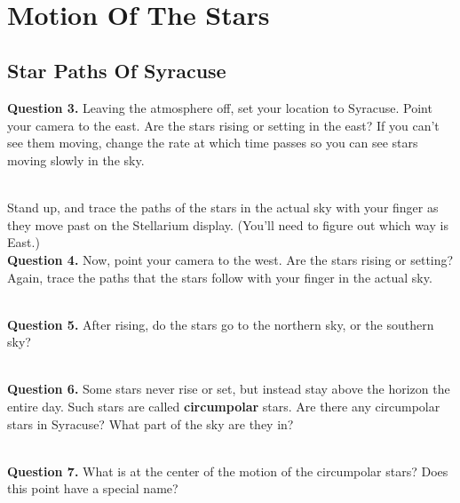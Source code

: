 \documentclass[11pt]{article}
\begin{document}
\hrulefill\\

\newpage

\section{Motion Of The Stars}

\subsection{Star Paths Of Syracuse}

\textbf{Question 3.} Leaving the atmosphere off, set your location to Syracuse. Point your camera to the east. Are the stars rising or setting in the east? If you can't see them moving, change the rate at which time passes so you can see stars moving slowly in
the sky.

\vspace*{1.5cm}

\hrulefill\\
Stand up, and trace the paths of the stars in the actual sky with your finger as they move past on the Stellarium display. (You'll need to figure out which way is East.) \\


\textbf{Question 4.} Now, point your camera to the west. Are the stars rising or setting? Again, trace the paths that the stars follow
with your finger in the actual sky.\\
\vspace*{1.5cm}

\hrulefill\\   

\textbf{Question 5.} After rising, do the stars go to the northern sky, or the southern sky?\\
\vspace*{1.5cm}

\hrulefill\\

\textbf{Question 6.} Some stars never rise or set, but instead stay above the horizon the entire day. Such stars are called \textbf{circumpolar} stars. Are there any circumpolar stars in Syracuse? What part of the sky are they in?\\
\vspace*{1.5cm}

\hrulefill\\
\newpage
\textbf{Question 7.} What is at the center of the motion of the circumpolar stars? Does this point have a special name?\\
\vspace*{1.5cm}
\end{document}
